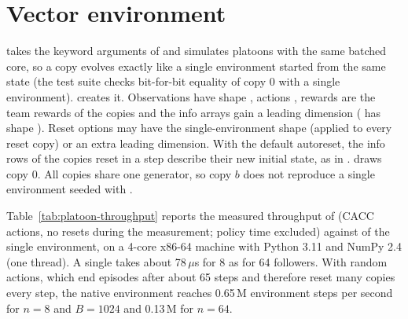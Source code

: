\section{Vector environment}\label{sec:platoon-vector}

 takes the keyword arguments of 
and simulates  platoons with the same batched core, so a copy
evolves exactly like a single environment started from the same state (the
test suite checks bit-for-bit equality of copy 0 with a single environment).
 creates it. Observations have
shape , actions , rewards are the team
rewards of the copies and the info arrays gain a leading 
dimension ( has shape ). Reset options may
have the single-environment shape (applied to every reset copy) or an extra
leading  dimension. With the default 
autoreset, the info rows of the copies reset in a step describe their new
initial state, as in . 
draws copy 0. All copies share one generator, so copy $b$ does not reproduce a
single environment seeded with .

Table~\ref{tab:platoon-throughput} reports the measured throughput of
 (CACC actions, no resets during the measurement; policy time
excluded) against  of the single
environment, on a 4-core x86-64 machine with Python 3.11 and NumPy 2.4 (one
thread). A single  takes about 78\,$\mu$s for 8 as for
64 followers. With random actions, which end episodes after about 65 steps and
therefore reset many copies every step, the native environment reaches
0.65\,M environment steps per second for $n = 8$ and $B = 1024$ and
0.13\,M for $n = 64$.

